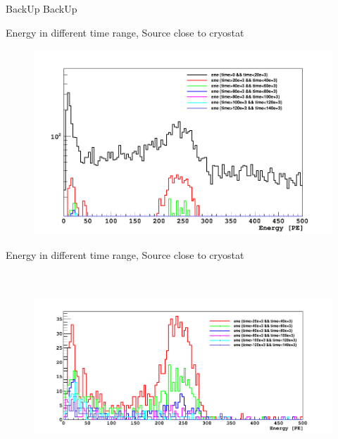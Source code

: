 \documentclass[9pt]{beamer}
\begin{document}

\begin{frame}{BackUp}
BackUp
\end{frame}

\begin{frame}{Energy in different time range, Source close to cryostat}
\begin{figure}
\includegraphics[height= 7cm, width=\textwidth]{nv_gamma_ene_all_sorts_Feb7PM.png}
\end{figure}
\end{frame}

\begin{frame}{Energy in different time range, Source close to cryostat}
\begin{figure}
\includegraphics[height= 7cm, width=\textwidth]{nv_gamma_ene_small_sorts_Feb7PM.png}
\end{figure}
\end{frame}
\end{document}
